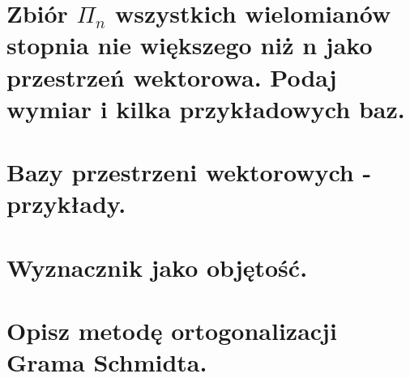 \section{Zbiór \texorpdfstring{\(\Pi_n\)}{Πn} wszystkich wielomianów stopnia nie większego niż n jako przestrzeń
wektorowa. Podaj wymiar i kilka przykładowych baz.}

\section{Bazy przestrzeni wektorowych - przykłady.}

\section{Wyznacznik jako objętość.}

\section{Opisz metodę ortogonalizacji Grama Schmidta.}